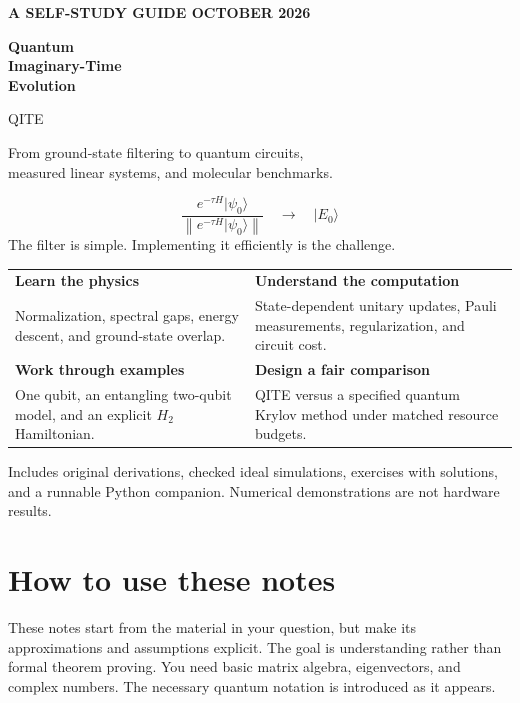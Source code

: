 \documentclass[11pt,a4paper]{article}
\newcommand{\ket}[1]{\lvert #1\rangle}
\newcommand{\norm}[1]{\left\lVert #1\right\rVert}
\begin{document}
\begin{titlepage}
\color{navy}
{\sffamily\small\bfseries A SELF-STUDY GUIDE \hfill OCTOBER 2026\par}
\vspace{1.6cm}
{\sffamily\fontsize{35}{40}\selectfont\bfseries Quantum\\Imaginary-Time\\Evolution\par}
\vspace{.5cm}
{\sffamily\fontsize{24}{29}\selectfont\color{teal}QITE\par}
\vspace{.8cm}
{\Large From ground-state filtering to quantum circuits,\\measured linear systems, and molecular benchmarks.\par}
\vspace{.8cm}
\begin{tcolorbox}[colback=pale,colframe=teal,boxrule=0pt,arc=1mm,left=13pt,right=13pt,top=15pt,bottom=15pt]
\[
\frac{e^{-\tau H}\ket{\psi_0}}{\norm{e^{-\tau H}\ket{\psi_0}}}
\quad\longrightarrow\quad \ket{E_0}
\]
\centering\sffamily\large
The filter is simple. Implementing it efficiently is the challenge.
\end{tcolorbox}
\vspace{.9cm}
\begin{tabularx}{\linewidth}{@{}X X@{}}
\textbf{Learn the physics} & \textbf{Understand the computation}\\[4pt]
Normalization, spectral gaps, energy descent, and ground-state overlap. & State-dependent unitary updates, Pauli measurements, regularization, and circuit cost.\\[12pt]
\textbf{Work through examples} & \textbf{Design a fair comparison}\\[4pt]
One qubit, an entangling two-qubit model, and an explicit $H_2$ Hamiltonian. & QITE versus a specified quantum Krylov method under matched resource budgets.
\end{tabularx}
\vfill
{\sffamily\small\color{graytext}Includes original derivations, checked ideal simulations, exercises with solutions, and a runnable Python companion. Numerical demonstrations are not hardware results.}
\end{titlepage}

\section*{How to use these notes}
These notes start from the material in your question, but make its approximations and assumptions explicit. The goal is understanding rather than formal theorem proving. You need basic matrix algebra, eigenvectors, and complex numbers. The necessary quantum notation is introduced as it appears.
\end{document}
